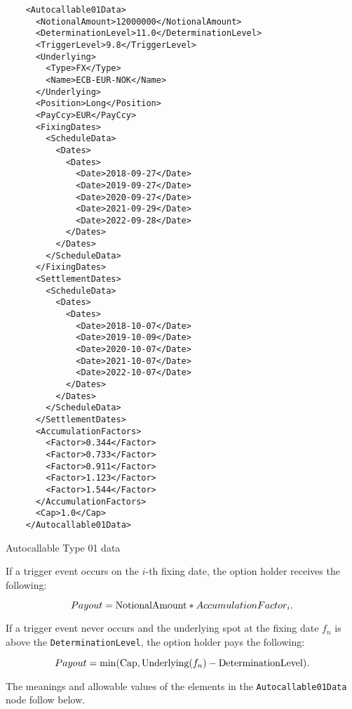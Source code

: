 \begin{listing}[H]
\begin{verbatim}
    <Autocallable01Data>
      <NotionalAmount>12000000</NotionalAmount>
      <DeterminationLevel>11.0</DeterminationLevel>
      <TriggerLevel>9.8</TriggerLevel>
      <Underlying>
        <Type>FX</Type>
        <Name>ECB-EUR-NOK</Name>
      </Underlying>
      <Position>Long</Position>
      <PayCcy>EUR</PayCcy>
      <FixingDates>
        <ScheduleData>
          <Dates>
            <Dates>
              <Date>2018-09-27</Date>
              <Date>2019-09-27</Date>
              <Date>2020-09-27</Date>
              <Date>2021-09-29</Date>
              <Date>2022-09-28</Date>
            </Dates>
          </Dates>
        </ScheduleData>
      </FixingDates>
      <SettlementDates>
        <ScheduleData>
          <Dates>
            <Dates>
              <Date>2018-10-07</Date>
              <Date>2019-10-09</Date>
              <Date>2020-10-07</Date>
              <Date>2021-10-07</Date>
              <Date>2022-10-07</Date>
            </Dates>
          </Dates>
        </ScheduleData>
      </SettlementDates>
      <AccumulationFactors>
        <Factor>0.344</Factor>
        <Factor>0.733</Factor>
        <Factor>0.911</Factor>
        <Factor>1.123</Factor>
        <Factor>1.544</Factor>
      </AccumulationFactors>
      <Cap>1.0</Cap>
    </Autocallable01Data>
\end{verbatim}
\caption{Autocallable Type 01 data}
\label{lst:autocallable01_data}
\end{listing}

If a trigger event occurs on the $i$-th fixing date, the option holder receives the following:

\begin{equation*}
  Payout = \text{\lstinline!NotionalAmount!} * AccumulationFactor_i.
\end{equation*}

If a trigger event never occurs and the underlying spot at the fixing date $f_n$ is above the \lstinline!DeterminationLevel!,
the option holder pays the following:

\begin{equation*}
  Payout = \min (\text{\lstinline!Cap!}, \text{\lstinline!Underlying!}(f_n) - \text{\lstinline!DeterminationLevel!}).
\end{equation*}

The meanings and allowable values of the elements in the \verb+Autocallable01Data+ node follow below.

